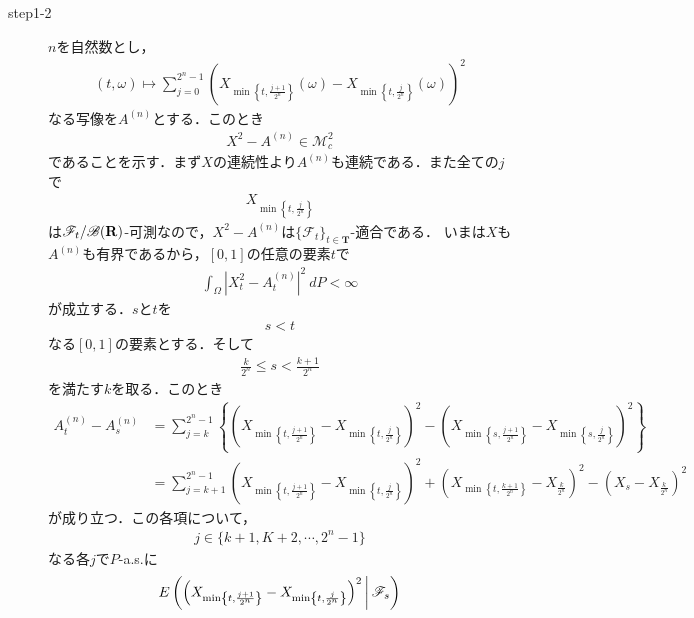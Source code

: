 \begin{sketch}
\begin{description}
			\item[step1-2] $n$を自然数とし，
				\begin{align}
					(t,\omega) \longmapsto \sum_{j=0}^{2^n-1} \left(X_{\min\left\{t,\frac{j+1}{2^n}\right\}}(\omega)
					- X_{\min\left\{t,\frac{j}{2^n}\right\}}(\omega)\right)^2
				\end{align}
				なる写像を$A^{(n)}$とする．このとき
				\begin{align}
					X^2 - A^{(n)} \in \mathscr{M}_{c}^{2}
					\label{fom:thm_decomposition_of_square_integrable_martingales_2}
				\end{align}
				であることを示す．まず$X$の連続性より$A^{(n)}$も連続である．また全ての$j$で
				\begin{align}
					X_{\min\left\{t,\frac{j}{2^n}\right\}}
				\end{align}
				は$\mathscr{F}_t/\mathscr{B}(\mathbf{R})$-可測なので，$X^2-A^{(n)}$は$\{\mathscr{F}_t\}_{t \in \mathbf{T}}$-適合である．
				いまは$X$も$A^{(n)}$も有界であるから，$[0,1]$の任意の要素$t$で
				\begin{align}
					\int_{\Omega} \left|X_t^2-A_t^{(n)}\right|^2\ dP < \infty
				\end{align}
				が成立する．$s$と$t$を
				\begin{align}
					s < t
				\end{align}
				なる$[0,1]$の要素とする．そして
				\begin{align}
					\frac{k}{2^n} \leq s < \frac{k+1}{2^n}
				\end{align}
				を満たす$k$を取る．このとき
				\begin{align}
					A^{(n)}_t - A^{(n)}_s
					&= \sum_{j=k}^{2^n-1} \left\{
					\left(X_{\min\left\{t,\frac{j+1}{2^n}\right\}} - X_{\min\left\{t,\frac{j}{2^n}\right\}}\right)^2
					- \left(X_{\min\left\{s,\frac{j+1}{2^n}\right\}} - X_{\min\left\{s,\frac{j}{2^n}\right\}}\right)^2\right\} \\
					&= \sum_{j=k+1}^{2^n-1} \left(X_{\min\left\{t,\frac{j+1}{2^n}\right\}} - X_{\min\left\{t,\frac{j}{2^n}\right\}}\right)^2
					+ \left(X_{\min\left\{t,\frac{k+1}{2^n}\right\}} - X_{\frac{k}{2^n}}\right)^2
					- \left(X_s - X_{\frac{k}{2^n}}\right)^2
				\end{align}
				が成り立つ．この各項について，
				\begin{align}
					j \in \{k+1,K+2,\cdots,2^n-1\}
				\end{align}
				なる各$j$で$P$-a.s.に
				\begin{align}
					\cexp{ \left(X_{\min\left\{t,\frac{j+1}{2^n}\right\}} - X_{\min\left\{t,\frac{j}{2^n}\right\}}\right)^2}{\mathscr{F}_s}

\end{align}
\end{description}
\end{sketch}

